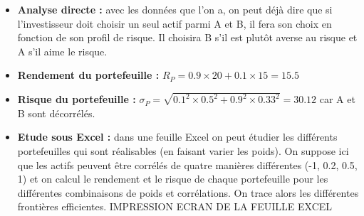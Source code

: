 \begin{itemize}
  \item \textbf{Analyse directe :} avec les données que l'on a, on peut déjà dire que si l'investisseur doit choisir un seul actif parmi A et B, il fera son choix en fonction de son profil de risque. Il choisira B s'il est plutôt averse au risque et A s'il aime le risque.\\

  \item \textbf{Rendement du portefeuille :} $ R_P = 0.9 \times 20 + 0.1 \times 15 = 15.5$\\

  \item \textbf{Risque du portefeuille :} $ \sigma_P = \sqrt{0.1^2 \times 0.5^2 + 0.9^2 \times 0.33^2} = 30.12$ car A et B sont décorrélés.\\

  \item \textbf{Etude sous Excel :} dans une feuille Excel on peut étudier les différents portefeuilles qui sont réalisables (en faisant varier les poids). On suppose ici que les actifs peuvent être corrélés de quatre manières différentes (-1, 0.2, 0.5, 1) et on calcul le rendement et le risque de chaque portefeuille pour les différentes combinaisons de poids et corrélations. On trace alors les différentes frontières efficientes.
IMPRESSION ECRAN DE LA FEUILLE EXCEL
\end{itemize}
